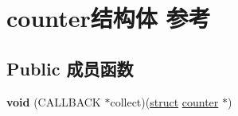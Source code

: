\hypertarget{structcounter}{}\section{counter结构体 参考}
\label{structcounter}
\subsection*{Public 成员函数}
\begin{DoxyCompactItemize}
\item 
\mbox{\label{structcounter_ad045ce9ade445010b633dd3d0c2cfaf7}} 
{\bfseries void} (C\+A\+L\+L\+B\+A\+CK $\ast$collect)(\hyperlink{interfacestruct}{struct} \hyperlink{structcounter}{counter} $\ast$)
\end{DoxyCompactItemize}
